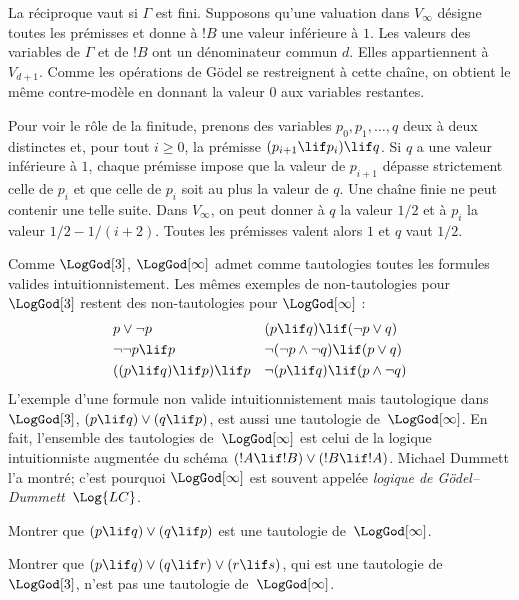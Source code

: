 \documentclass[../../../include/open-logic-section]{subfiles}
\begin{document}
La réciproque vaut si $\Gamma$ est fini. Supposons qu'une
valuation dans $V_\infty$ désigne toutes les prémisses et donne
à $!B$ une valeur inférieure à $1$. Les valeurs des variables
de $\Gamma$ et de $!B$ ont un dénominateur commun $d$.
Elles appartiennent à $V_{d+1}$. Comme les opérations de G\"odel
se restreignent à cette chaîne, on obtient le même contre-modèle
en donnant la valeur $0$ aux variables restantes.

Pour voir le rôle de la finitude, prenons des variables
$p_0,p_1,\ldots,q$ deux à deux distinctes et, pour tout $i\geq 0$,
la prémisse $(p_{i+1}\lif p_i)\lif q$. Si $q$ a une valeur
inférieure à $1$, chaque prémisse impose que la valeur de
$p_{i+1}$ dépasse strictement celle de $p_i$ et que celle de
$p_i$ soit au plus la valeur de $q$. Une chaîne finie ne
peut contenir une telle suite. Dans $V_\infty$, on peut donner
à $q$ la valeur $1/2$ et à $p_i$ la valeur $1/2-1/(i+2)$.
Toutes les prémisses valent alors $1$ et $q$ vaut $1/2$.

Comme $\LogGod[3]$,
$\LogGod[\infty]$ admet comme
tautologies toutes les formules
valides intuitionnistement. Les mêmes
exemples de non-tautologies pour
$\LogGod[3]$ restent des
non-tautologies pour
$\LogGod[\infty]$ :
\begin{align*}
  & p\lor\lnot p && (p\lif q)\lif(\lnot p\lor q) \\
  & \lnot\lnot p\lif p && \lnot(\lnot p\land\lnot q)\lif(p\lor q) \\
  & ((p\lif q)\lif p)\lif p && \lnot(p\lif q)\lif(p\land\lnot q)
\end{align*}
L'exemple d'une formule non valide
intuitionnistement mais tautologique
dans~$\LogGod[3]$,
$(p\lif q)\lor(q\lif p)$, est aussi
une tautologie de~$\LogGod[\infty]$.
En fait, l'ensemble des tautologies
de~$\LogGod[\infty]$ est celui de la
logique intuitionniste augmentée du
schéma
$(!A\lif !B)\lor(!B\lif !A)$.
Michael Dummett l'a montré; c'est
pourquoi $\LogGod[\infty]$ est
souvent appelée \emph{logique de
G\"odel--Dummett}~$\Log{LC}$.

\begin{prob}
  Montrer que
  $(p\lif q)\lor(q\lif p)$ est une
  tautologie de~$\LogGod[\infty]$.
\end{prob}

\begin{prob}
  Montrer que
  $(p\lif q)\lor(q\lif r)\lor(r\lif s)$,
  qui est une tautologie de
  $\LogGod[3]$, n'est pas une
  tautologie de~$\LogGod[\infty]$.
\end{prob}
\end{document}
